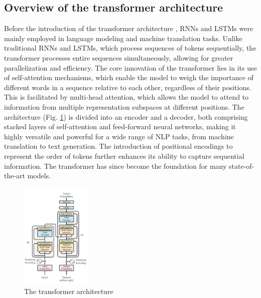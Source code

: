 \documentclass[conference]{IEEEtran}
\begin{document}
\subsection{Overview of the transformer architecture}
Before the introduction of the transformer architecture \cite{NIPS2017_3f5ee243}, RNNs and LSTMs were mainly employed in language modeling and machine translation tasks. 
Unlike traditional RNNs and LSTMs, which process sequences of tokens sequentially, the transformer processes entire sequences simultaneously, allowing for greater parallelization and efficiency. The core innovation of the transformer lies in its use of self-attention mechanisms, which enable the model to weigh the importance of different words in a sequence relative to each other, regardless of their positions. This is facilitated by multi-head attention, which allows the model to attend to information from multiple representation subspaces at different positions. The architecture (Fig. \ref{fig:transformer_architecture}) is divided into an encoder and a decoder, both comprising stacked layers of self-attention and feed-forward neural networks, making it highly versatile and powerful for a wide range of NLP tasks, from machine translation to text generation. The introduction of positional encodings to represent the order of tokens further enhances its ability to capture sequential information. The transformer has since become the foundation for many state-of-the-art models.
\begin{figure}[ht]
    \centering
    \includegraphics[width=0.3\textwidth]{images/transformer_architecture.png}
    \caption{The transformer architecture}
    \label{fig:transformer_architecture}
\end{figure}
\end{document}
